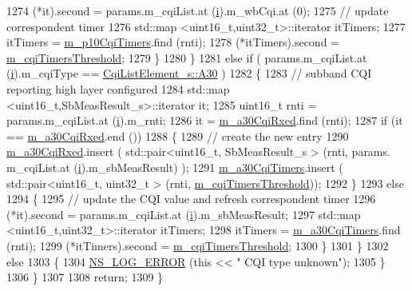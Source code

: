 \begin{DoxyCode}
1274               (*it).second = params.m\_cqiList.at (\hyperlink{bernuolliDistribution_8m_a6f6ccfcf58b31cb6412107d9d5281426}{i}).m\_wbCqi.at (0);
1275               \textcolor{comment}{// update correspondent timer}
1276               std::map <uint16\_t,uint32\_t>::iterator itTimers;
1277               itTimers = \hyperlink{classns3_1_1TdBetFfMacScheduler_a1b59f4b00f23f363702a1c9679fe18a1}{m\_p10CqiTimers}.find (rnti);
1278               (*itTimers).second = \hyperlink{classns3_1_1TdBetFfMacScheduler_ad423d7c181e089b37159502bad92bccd}{m\_cqiTimersThreshold};
1279             \}
1280         \}
1281       \textcolor{keywordflow}{else} \textcolor{keywordflow}{if} ( params.m\_cqiList.at (\hyperlink{bernuolliDistribution_8m_a6f6ccfcf58b31cb6412107d9d5281426}{i}).m\_cqiType == \hyperlink{structns3_1_1CqiListElement__s_a8f1bd827fd9842e7c07e39265d88299aab9a9d64494e36c89d7932a00edb056a7}{CqiListElement\_s::A30} )
1282         \{
1283           \textcolor{comment}{// subband CQI reporting high layer configured}
1284           std::map <uint16\_t,SbMeasResult\_s>::iterator it;
1285           uint16\_t rnti = params.m\_cqiList.at (\hyperlink{bernuolliDistribution_8m_a6f6ccfcf58b31cb6412107d9d5281426}{i}).m\_rnti;
1286           it = \hyperlink{classns3_1_1TdBetFfMacScheduler_a97570d78f267884fd17897979a0c1da8}{m\_a30CqiRxed}.find (rnti);
1287           \textcolor{keywordflow}{if} (it == \hyperlink{classns3_1_1TdBetFfMacScheduler_a97570d78f267884fd17897979a0c1da8}{m\_a30CqiRxed}.end ())
1288             \{
1289               \textcolor{comment}{// create the new entry}
1290               \hyperlink{classns3_1_1TdBetFfMacScheduler_a97570d78f267884fd17897979a0c1da8}{m\_a30CqiRxed}.insert ( std::pair<uint16\_t, SbMeasResult\_s > (rnti, params.
      m\_cqiList.at (\hyperlink{bernuolliDistribution_8m_a6f6ccfcf58b31cb6412107d9d5281426}{i}).m\_sbMeasResult) );
1291               \hyperlink{classns3_1_1TdBetFfMacScheduler_a7e0161875c90392333763dd0b96b405a}{m\_a30CqiTimers}.insert ( std::pair<uint16\_t, uint32\_t > (rnti, 
      \hyperlink{classns3_1_1TdBetFfMacScheduler_ad423d7c181e089b37159502bad92bccd}{m\_cqiTimersThreshold}));
1292             \}
1293           \textcolor{keywordflow}{else}
1294             \{
1295               \textcolor{comment}{// update the CQI value and refresh correspondent timer}
1296               (*it).second = params.m\_cqiList.at (\hyperlink{bernuolliDistribution_8m_a6f6ccfcf58b31cb6412107d9d5281426}{i}).m\_sbMeasResult;
1297               std::map <uint16\_t,uint32\_t>::iterator itTimers;
1298               itTimers = \hyperlink{classns3_1_1TdBetFfMacScheduler_a7e0161875c90392333763dd0b96b405a}{m\_a30CqiTimers}.find (rnti);
1299               (*itTimers).second = \hyperlink{classns3_1_1TdBetFfMacScheduler_ad423d7c181e089b37159502bad92bccd}{m\_cqiTimersThreshold};
1300             \}
1301         \}
1302       \textcolor{keywordflow}{else}
1303         \{
1304           \hyperlink{group__logging_ga0261a8db1d4ac5f79417d117634fd455}{NS\_LOG\_ERROR} (\textcolor{keyword}{this} << \textcolor{stringliteral}{" CQI type unknown"});
1305         \}
1306     \}
1307 
1308   \textcolor{keywordflow}{return};
1309 \}
\end{DoxyCode}


